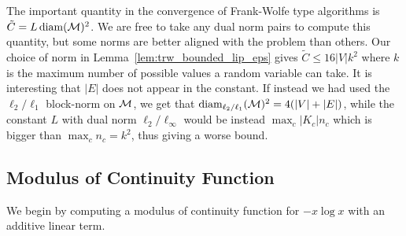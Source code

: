 \begin{remark}
The important quantity in the convergence of Frank-Wolfe type algorithms is $\tilde{C} = L \operatorname{diam}(\mathcal{M})^2$. We are free to take any dual norm pairs to compute this quantity, but some norms are better aligned with the problem than others. Our choice of norm in Lemma~\ref{lem:trw_bounded_lip_eps} gives $\tilde{C} \leq 16 |V| k^2$ where $k$ is the maximum number of possible values a random variable can take. It is interesting that $|E|$ does not appear in the constant. If instead we had used the $\ell_2/\ell_1$ block-norm on $\mathcal{M}$, we get that $\operatorname{diam}_{\ell_2/\ell_1}(\mathcal{M})^2 = 4 (|V| + |E|)$, while the constant $L$ with dual norm $\ell_2/\ell_\infty$ would be instead $\max_c |K_c| n_c$ which is bigger than $\max_c n_c = k^2$, thus giving a worse bound. 
\end{remark}

\subsection{Modulus of Continuity Function} \label{sec:trw_weak_lip}
%
We begin by computing a modulus of continuity function for $-x \log x$ with an additive linear term.

